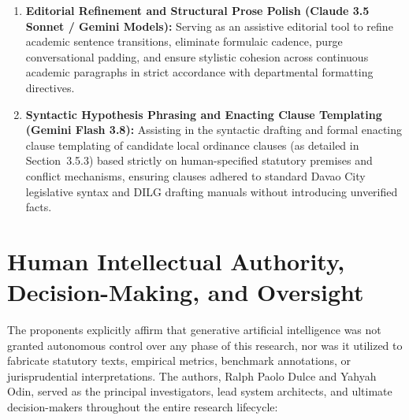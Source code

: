 \begin{enumerate}[leftmargin=2.0em, itemsep=5pt]
    \item \textbf{Editorial Refinement and Structural Prose Polish (Claude 3.5 Sonnet / Gemini Models):} 
    Serving as an assistive editorial tool to refine academic sentence transitions, eliminate formulaic cadence, purge conversational padding, and ensure stylistic cohesion across continuous academic paragraphs in strict accordance with departmental formatting directives.
    
    \item \textbf{Syntactic Hypothesis Phrasing and Enacting Clause Templating (Gemini Flash 3.8):} 
    Assisting in the syntactic drafting and formal enacting clause templating of candidate local ordinance clauses (as detailed in Section~3.5.3) based strictly on human-specified statutory premises and conflict mechanisms, ensuring clauses adhered to standard Davao City legislative syntax and DILG drafting manuals without introducing unverified facts.
\end{enumerate}

\section*{Human Intellectual Authority, Decision-Making, and Oversight}

The proponents explicitly affirm that generative artificial intelligence was not granted autonomous control over any phase of this research, nor was it utilized to fabricate statutory texts, empirical metrics, benchmark annotations, or jurisprudential interpretations. The authors, Ralph Paolo Dulce and Yahyah Odin, served as the principal investigators, lead system architects, and ultimate decision-makers throughout the entire research lifecycle:

